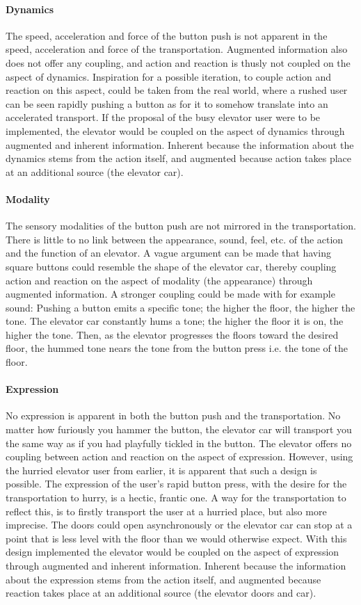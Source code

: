 \paragraph{Dynamics} The speed, acceleration and force of the button push is not apparent in the speed, acceleration and force of the transportation. Augmented information also does not offer any coupling, and action and reaction is thusly not coupled on the aspect of dynamics. Inspiration for a possible iteration, to couple action and reaction on this aspect, could be taken from the real world, where a rushed user can be seen rapidly pushing a button as for it to somehow translate into an accelerated transport. If the proposal of the busy elevator user were to be implemented, the elevator would be coupled on the aspect of dynamics through augmented and inherent information. Inherent because the information about the dynamics stems from the action itself, and augmented because action takes place at an additional source (the elevator car).
\paragraph{Modality} The sensory modalities of the button push are not mirrored in the transportation. There is little to no link between the appearance, sound, feel, etc. of the action and the function of an elevator. A vague argument can be made that having square buttons could resemble the shape of the elevator car, thereby coupling action and reaction on the aspect of modality (the appearance) through augmented information. A stronger coupling could be made with for example sound: Pushing a button emits a specific tone; the higher the floor, the higher the tone. The elevator car constantly hums a tone; the higher the floor it is on, the higher the tone. Then, as the elevator progresses the floors toward the desired floor, the hummed tone nears the tone from the button press i.e. the tone of the floor.
\paragraph{Expression} No expression is apparent in both the button push and the transportation. No matter how furiously you hammer the button, the elevator car will transport you the same way as if you had playfully tickled in the button. The elevator offers no coupling between action and reaction on the aspect of expression. However, using the hurried elevator user from earlier, it is apparent that such a design is possible. The expression of the user's rapid button press, with the desire for the transportation to hurry, is a hectic, frantic one. A way for the transportation to reflect this, is to firstly transport the user at a hurried place, but also more imprecise. The doors could open asynchronously or the elevator car can stop at a point that is less level with the floor than we would otherwise expect. With this design implemented the elevator would be coupled on the aspect of expression through augmented and inherent information. Inherent because the information about the expression stems from the action itself, and augmented because reaction takes place at an additional source (the elevator doors and car). \\

